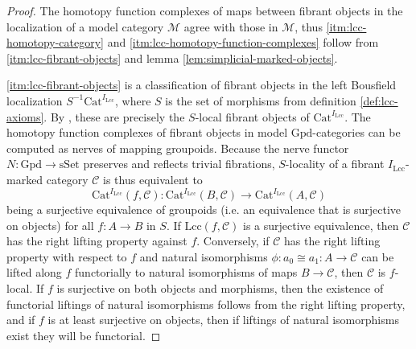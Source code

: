 \documentclass[a4paper]{article}
\theoremstyle{remark}
\theoremstyle{definition}
\begin{document}
\begin{proof}
  The homotopy function complexes of maps between fibrant objects in the localization of a model category $\mathcal{M}$ agree with those in $\mathcal{M}$, thus \ref{itm:lcc-homotopy-category} and \ref{itm:lcc-homotopy-function-complexes} follow from \ref{itm:lcc-fibrant-objects} and lemma \ref{lem:simplicial-marked-objects}.

  \ref{itm:lcc-fibrant-objects} is a classification of fibrant objects in the left Bousfield localization $S^{-1} \mathrm{Cat}^{I_\mathrm{Lcc}}$, where $S$ is the set of morphisms from definition \ref{def:lcc-axioms}.
  By \cite[Theorem 4.1.1]{hirschhorn}, these are precisely the $S$-local fibrant objects of $\mathrm{Cat}^{I_\mathrm{Lcc}}$.
  The homotopy function complexes of fibrant objects in model $\mathrm{Gpd}$-categories can be computed as nerves of mapping groupoids.
  Because the nerve functor $N : \mathrm{Gpd} \rightarrow \mathrm{sSet}$ preserves and reflects trivial fibrations, $S$-locality of a fibrant $I_\mathrm{Lcc}$-marked category $\mathcal{C}$ is thus equivalent to 
  \begin{equation}
    \mathrm{Cat}^{I_\mathrm{Lcc}}(f, \mathcal{C}) : \mathrm{Cat}^{I_\mathrm{Lcc}}(B, \mathcal{C}) \rightarrow \mathrm{Cat}^{I_\mathrm{Lcc}}(A, \mathcal{C})
  \end{equation}
  being a surjective equivalence of groupoids (i.e. an equivalence that is surjective on objects) for all $f : A \rightarrow B$ in $S$.
  If $\mathrm{Lcc}(f, \mathcal{C})$ is a surjective equivalence, then $\mathcal{C}$ has the right lifting property against $f$.
  Conversely, if $\mathcal{C}$ has the right lifting property with respect to $f$ and natural isomorphisms $\phi : a_0 \cong a_1 : A \rightarrow \mathcal{C}$ can be lifted along $f$ functorially to natural isomorphisms of maps $B \rightarrow \mathcal{C}$, then $\mathcal{C}$ is $f$-local.
  If $f$ is surjective on both objects and morphisms, then the existence of functorial liftings of natural isomorphisms follows from the right lifting property, and if $f$ is at least surjective on objects, then if liftings of natural isomorphisms exist they will be functorial.
  

\end{proof}
\end{document}
